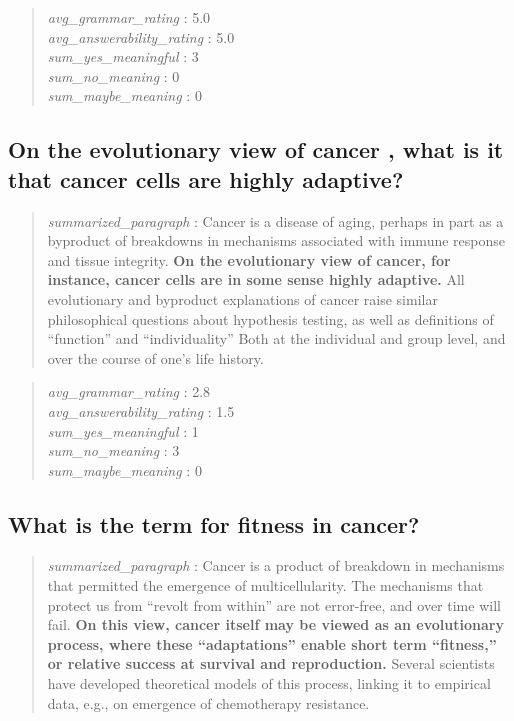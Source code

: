 \begin{quote}
\emph{avg\_grammar\_rating} : 5.0\\
\emph{avg\_answerability\_rating} : 5.0\\
\emph{sum\_yes\_meaningful} : 3\\
\emph{sum\_no\_meaning} : 0\\
\emph{sum\_maybe\_meaning} : 0
\end{quote}

\hypertarget{on-the-evolutionary-view-of-cancer-what-is-it-that-cancer-cells-are-highly-adaptive}{%
\subsection{On the evolutionary view of cancer , what is it that cancer
cells are highly
adaptive?}\label{on-the-evolutionary-view-of-cancer-what-is-it-that-cancer-cells-are-highly-adaptive}}

\begin{quote}
\emph{summarized\_paragraph} : Cancer is a disease of aging, perhaps in
part as a byproduct of breakdowns in mechanisms associated with immune
response and tissue integrity. \textbf{On the evolutionary view of
cancer, for instance, cancer cells are in some sense highly adaptive.}
All evolutionary and byproduct explanations of cancer raise similar
philosophical questions about hypothesis testing, as well as definitions
of ``function'' and ``individuality'' Both at the individual and group
level, and over the course of one's life history.
\end{quote}

\begin{quote}
\emph{avg\_grammar\_rating} : 2.8\\
\emph{avg\_answerability\_rating} : 1.5\\
\emph{sum\_yes\_meaningful} : 1\\
\emph{sum\_no\_meaning} : 3\\
\emph{sum\_maybe\_meaning} : 0
\end{quote}

\hypertarget{what-is-the-term-for-fitness-in-cancer}{%
\subsection{What is the term for fitness in
cancer?}\label{what-is-the-term-for-fitness-in-cancer}}

\begin{quote}
\emph{summarized\_paragraph} : Cancer is a product of breakdown in
mechanisms that permitted the emergence of multicellularity. The
mechanisms that protect us from ``revolt from within'' are not
error-free, and over time will fail. \textbf{On this view, cancer itself
may be viewed as an evolutionary process, where these ``adaptations''
enable short term ``fitness,'' or relative success at survival and
reproduction.} Several scientists have developed theoretical models of
this process, linking it to empirical data, e.g., on emergence of
chemotherapy resistance.
\end{quote}


